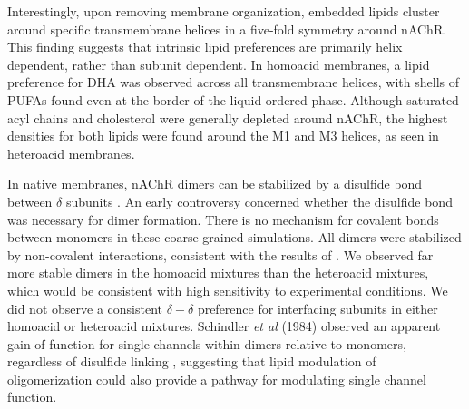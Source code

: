 Interestingly, upon removing membrane organization, embedded lipids cluster around specific transmembrane helices in a five-fold symmetry around nAChR. This finding suggests that intrinsic lipid preferences are primarily helix dependent, rather than subunit dependent. In homoacid membranes, a lipid preference for DHA was observed across all transmembrane helices, with shells of PUFAs found even at the border of the liquid-ordered phase. Although saturated acyl chains and cholesterol were generally depleted around nAChR, the highest densities for both lipids were found around the M1 and M3 helices, as seen in heteroacid membranes.

In native membranes, nAChR dimers can be stabilized by a disulfide bond between $\delta$ subunits \citep{Chang1977}.  An early controversy \citep{Anholt1980,Ruechel1981,Zingsheim1982,Schindler1984} concerned whether the disulfide bond was necessary for dimer formation. There is no mechanism for covalent bonds between monomers in these coarse-grained simulations. All dimers were stabilized by non-covalent interactions, consistent with the results of \citep{Ruechel1981,Schindler1984}. We observed far more stable dimers in the homoacid mixtures than the heteroacid mixtures, which would be consistent with high sensitivity to experimental conditions. We did not observe a consistent $\delta-\delta$ preference for interfacing subunits in either homoacid or heteroacid mixtures. Schindler {\it et al} (1984) observed an apparent gain-of-function for single-channels within dimers relative to monomers, regardless of disulfide linking \citep{Schindler1984}, suggesting that lipid modulation of oligomerization could also provide a pathway for modulating single channel function. 
